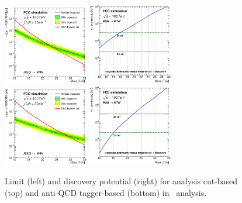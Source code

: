 \begin{figure}[!htb]\centering
\includegraphics[width=0.33\textwidth]{Fig/RSGww/lim_RSGraviton_ww_fcc_v02_cut.eps}
\includegraphics[width=0.33\textwidth]{Fig/RSGww/DiscoveryPotential_ww_cut_rootStyle.eps}
\includegraphics[width=0.33\textwidth]{Fig/RSGww/lim_RSGraviton_ww_fcc_v02_tagger.eps}
\includegraphics[width=0.33\textwidth]{Fig/RSGww/DiscoveryPotential_ww_tagger_rootStyle.eps}
\caption{Limit (left) and discovery potential (right) for analysis cut-based (top) and anti-QCD tagger-based (bottom) in \rsg\ analysis.}
\label{fig:RSWww_limit}
\end{figure}

